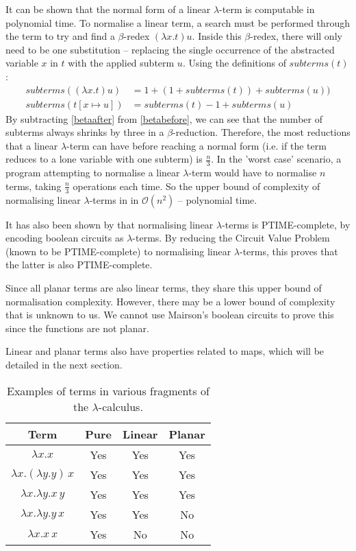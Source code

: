 \documentclass[11pt]{article}
\begin{document}
It can be shown that the normal form of a linear $\lambda$-term is computable in polynomial time. To normalise a linear term, a search must be performed through the term to try and find a $\beta$-redex $(\lambda x. t)u$. Inside this $\beta$-redex, there will only need to be one substitution -- replacing the single occurrence of the abstracted variable $x$ in $t$ with the applied subterm $u$. Using the definitions of $subterms(t)$:
%
\begin{align}
    subterms((\lambda x.t)u) &= 1 + (1 + subterms(t)) + subterms(u)) \label{betabefore}\\
    subterms(t[x \mapsto u]) &= subterms(t) - 1 + subterms(u) \label{betaafter}
\end{align}
%
By subtracting \ref{betaafter} from \ref{betabefore}, we can see that the number of subterms always shrinks by three in a $\beta$-reduction. Therefore, the most reductions that a linear $\lambda$-term can have before reaching a normal form (i.e. if the term reduces to a lone variable with one subterm) is $\frac{n}{3}$. In the 'worst case' scenario, a program attempting to normalise a linear $\lambda$-term would have to normalise $n$ terms, taking $\frac{n}{3}$ operations each time. So the upper bound of complexity of normalising linear $\lambda$-terms in in $\mathcal{O}(n^2)$ -- polynomial time.

It has also been shown by \cite{mairson} that normalising linear $\lambda$-terms is PTIME-complete, by encoding boolean circuits as $\lambda$-terms. By reducing the Circuit Value Problem (known to be PTIME-complete) to normalising linear $\lambda$-terms, this proves that the latter is also PTIME-complete.

Since all planar terms are also linear terms, they share this upper bound of normalisation complexity. However, there may be a lower bound of complexity that is unknown to us. We cannot use Mairson's boolean circuits to prove this since the functions are not planar.

Linear and planar terms also have properties related to maps, which will be detailed in the next section.

\begin{table}
    \centering
    \begin{tabular}{|c|c|c|c|}
        \hline
        \textbf{Term} & \textbf{Pure} & \textbf{Linear} & \textbf{Planar} \\
        \hline
        $\lambda x. x$ & Yes & Yes & Yes \\
        \hline
        $\lambda x. (\lambda y. y) \, x$ & Yes & Yes & Yes \\
        \hline
        $\lambda x.\lambda y. x \, y$ & Yes & Yes & Yes \\
        \hline
        $\lambda x. \lambda y. y \, x$ & Yes & Yes & No \\
        \hline
        $\lambda x. x \, x$ & Yes & No & No \\
        \hline
    \end{tabular}
    \caption{Examples of terms in various fragments of the $\lambda$-calculus.}
    \label{tab:fragments}
\end{table}
\end{document}
